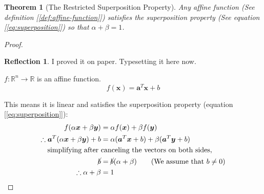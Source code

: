 \documentclass[11pt]{book}
\theoremstyle{definition}
\theoremstyle{plain}
\newtheorem{theorem}{Theorem}
\theoremstyle{problemstyle}
\theoremstyle{remark}
\theoremstyle{definition}
\newtheorem{reflection}{Reflection}
\begin{document}
\begin{theorem}[The Restricted Superposition Property]
    \label{th:affine-function-superposition}
    Any affine function (See definition [\ref{def:affine-function}]) satisfies the superposition property (See equation [\ref{eq:superposition}]) so that $\alpha+\beta=1$.
\end{theorem}
\begin{proof}
    \begin{reflection}
        I proved it on paper. Typesetting it here now.
    \end{reflection}

    $f:\mathbb{R}^n\rightarrow\mathbb{R}$ is an affine function. 
    \begin{equation}
        \label{eq:affine-function-superposition-1}
        f(\boldsymbol{x})=\boldsymbol{a}^T\boldsymbol{x}+b
    \end{equation}

    This means it is linear and satisfies the superposition property (equation [\ref{eq:superposition}]):
    \begin{equation}
        \label{eq:affine-function-superposition-2}
        \begin{aligned}
            f(\alpha\boldsymbol{x}+\beta\boldsymbol{y})&=\alpha f(\boldsymbol{x})+\beta f(\boldsymbol{y})\\
            \therefore\boldsymbol{a}^T(\alpha\boldsymbol{x}+\beta\boldsymbol{y})+b&=\alpha(\boldsymbol{a}^T\boldsymbol{x}+b)+\beta(\boldsymbol{a}^T\boldsymbol{y}+b)\\
            \text{simplifying after }&\text{canceling the vectors on both sides},\\
            \cancel{b}&=\cancel{b}(\alpha+\beta)\quad\quad(\text{We assume that } b\ne 0)\\
            \therefore\alpha+\beta&=1
        \end{aligned}
    \end{equation}
\end{proof}
\end{document}
